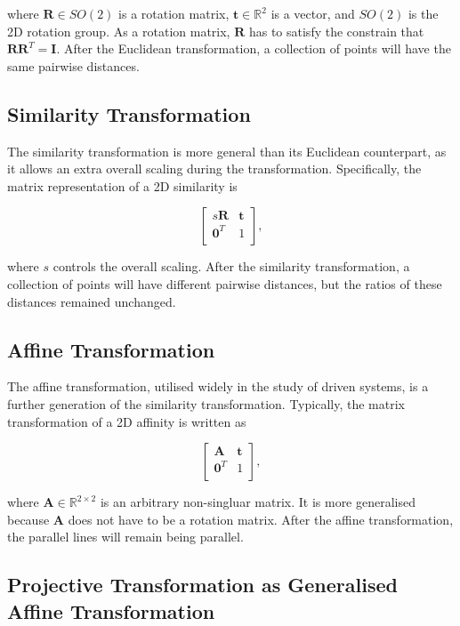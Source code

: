\documentclass[11pt,twoside]{report}
\begin{document}
\noindent where $\mathbf{R} \in SO(2)$ is a rotation matrix, $\mathbf{t} \in \mathbb{R}^2$ is a vector, and $SO(2)$ is the 2D rotation group. As a rotation matrix, $\mathbf{R}$ has to satisfy the constrain that $\mathbf{R}\mathbf{R}^T = \mathbf{I}$. After the Euclidean transformation, a collection of points will have the same pairwise distances. 

\subsection{Similarity Transformation}

The similarity transformation is more general than its Euclidean counterpart, as it allows an extra overall scaling during the transformation. Specifically, the matrix representation of a 2D similarity is

$$
 \begin{bmatrix}
	s\mathbf{R} & \mathbf{t}\\
	\mathbf{0}^T & 1\\
\end{bmatrix},
$$

\noindent where $s$ controls the overall scaling. After the similarity transformation, a collection of points will have different pairwise distances, but the ratios of these distances remained unchanged.

\subsection{Affine Transformation}

The affine transformation, utilised widely in the study of driven systems, is a further generation of the similarity transformation. Typically, the matrix transformation of a 2D affinity is written as

$$
\begin{bmatrix}
	\mathbf{A} & \mathbf{t}\\
	\mathbf{0}^T & 1\\
\end{bmatrix},
$$

\noindent where $\mathbf{A} \in \mathbb{R}^{2 \times 2}$ is an arbitrary non-singluar matrix. It is more generalised because $\mathbf{A}$ does not have to be a rotation matrix. After the affine transformation, the parallel lines will remain being parallel.

\subsection{Projective Transformation as Generalised Affine Transformation}
\end{document}

